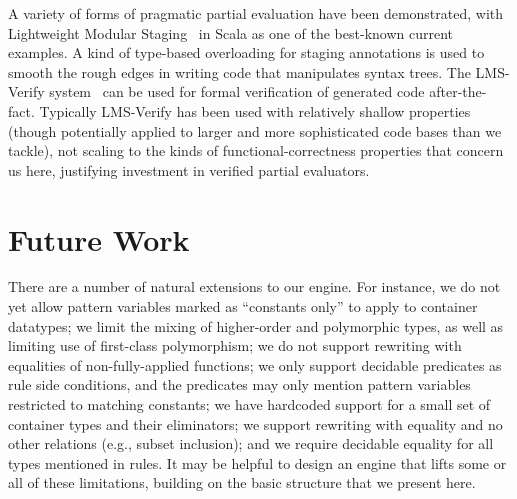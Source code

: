 A variety of forms of pragmatic partial evaluation have been demonstrated, with Lightweight Modular Staging~\cite{LMS} in Scala as one of the best-known current examples.
A kind of type-based overloading for staging annotations is used to smooth the rough edges in writing code that manipulates syntax trees.
The LMS-Verify system~\cite{LMSVerify} can be used for formal verification of generated code after-the-fact.
Typically LMS-Verify has been used with relatively shallow properties (though potentially applied to larger and more sophisticated code bases than we tackle), not scaling to the kinds of functional-correctness properties that concern us here, justifying investment in verified partial evaluators.

\section{Future Work}

There are a number of natural extensions to our engine.
For instance, we do not yet allow pattern variables marked as ``constants only'' to apply to container datatypes; we limit the mixing of higher-order and polymorphic types, as well as limiting use of first-class polymorphism; we do not support rewriting with equalities of non-fully-applied functions; we only support decidable predicates as rule side conditions, and the predicates may only mention pattern variables restricted to matching constants; we have hardcoded support for a small set of container types and their eliminators; we support rewriting with equality and no other relations (e.g., subset inclusion); and we require decidable equality for all types mentioned in rules.
It may be helpful to design an engine that lifts some or all of these limitations, building on the basic structure that we present here.

%
\clearpage


